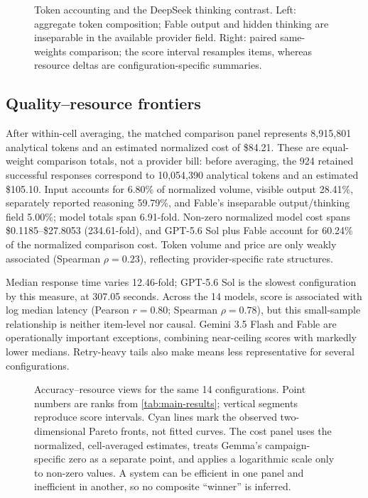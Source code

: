 \documentclass[11pt,a4paper,twocolumn]{article}
\begin{document}
\begin{figure}[!t]
\centering
\resizebox{0.95\textwidth}{!}{}
\caption{Token accounting and the DeepSeek thinking contrast. Left: aggregate
token composition; Fable output and hidden thinking are inseparable in the
available provider field. Right: paired same-weights comparison; the score
interval resamples items, whereas resource deltas are configuration-specific
summaries.}
\label{fig:ablation}
\end{figure}

\subsection{Quality--resource frontiers}

After within-cell averaging, the matched comparison panel represents 8,915,801
analytical tokens and an estimated normalized cost of \$84.21. These are
equal-weight comparison totals, not a provider bill: before averaging, the 924
retained successful responses correspond to 10,054,390 analytical tokens and
an estimated \$105.10. Input accounts for 6.80\% of normalized volume, visible output 28.41\%, separately reported reasoning
59.79\%, and Fable's inseparable output/thinking field 5.00\%; model totals span
6.91-fold. Non-zero normalized model cost spans \$0.1185--\$27.8053
(234.61-fold), and GPT-5.6 Sol plus Fable account for 60.24\% of the normalized
comparison cost. Token volume and
price are only weakly associated (Spearman $\rho=0.23$), reflecting
provider-specific rate structures.

Median response time varies 12.46-fold; GPT-5.6 Sol is the slowest configuration
by this measure, at 307.05 seconds. Across the 14 models, score is associated
with log median latency (Pearson $r=0.80$; Spearman $\rho=0.78$), but this
small-sample relationship is neither item-level nor causal. Gemini 3.5 Flash
and Fable are operationally important exceptions, combining near-ceiling scores
with markedly lower medians. Retry-heavy tails also make means less
representative for several configurations.

\begin{figure}[!t]
\centering
\resizebox{0.98\textwidth}{!}{}
\caption{Accuracy--resource views for the same 14 configurations. Point
numbers are ranks from \cref{tab:main-results}; vertical segments reproduce
score intervals. Cyan lines mark the observed two-dimensional Pareto fronts,
not fitted curves. The cost panel uses the normalized, cell-averaged estimates,
treats Gemma's campaign-specific zero as a separate point, and applies a
logarithmic scale only to non-zero values. A system
can be efficient in one panel and inefficient in another, so no composite
``winner'' is inferred.}
\label{fig:frontiers}
\end{figure}
\end{document}
